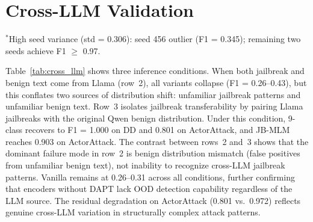 \section{Cross-LLM Validation}
\label{app:cross_llm}

\begin{table}[ht]
\centering
\footnotesize
\caption{Cross-LLM validation (F1, full conversation). All models are trained on Qwen3-8B data; conditions vary the source of jailbreak (JB) and benign (ben.) conversations at inference. Values are evaluated under a matched 50-sample subset protocol and differ from Table~\ref{tab:evidence_hierarchy}, which uses the full evaluation set.}
\label{tab:cross_llm}
\vspace{-2pt}
{\footnotesize $^{*}$High seed variance (std = 0.306): seed 456 outlier (F1 = 0.345); remaining two seeds achieve F1 $\geq$ 0.97.}
\end{table}

Table~\ref{tab:cross_llm} shows three inference conditions. When both jailbreak and benign text come from Llama (row~2), all variants collapse (F1 = 0.26--0.43), but this conflates two sources of distribution shift: unfamiliar jailbreak patterns and unfamiliar benign text. Row~3 isolates jailbreak transferability by pairing Llama jailbreaks with the original Qwen benign distribution. Under this condition, 9-class recovers to F1 = 1.000 on DD and 0.801 on ActorAttack, and JB-MLM reaches 0.903 on ActorAttack. The contrast between rows~2 and~3 shows that the dominant failure mode in row~2 is benign distribution mismatch (false positives from unfamiliar benign text), not inability to recognize cross-LLM jailbreak patterns. Vanilla remains at 0.26--0.31 across all conditions, further confirming that encoders without DAPT lack OOD detection capability regardless of the LLM source. The residual degradation on ActorAttack (0.801 vs.\ 0.972) reflects genuine cross-LLM variation in structurally complex attack patterns.

